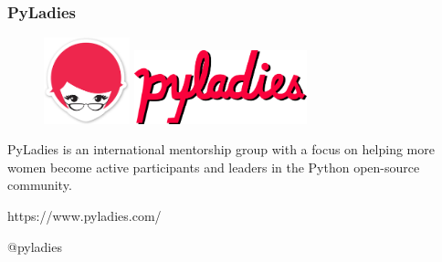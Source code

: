 \documentclass[18pt]{beamer}
\begin{document}
\begin{frame}

	\frametitle{PyLadies}
	
	\begin{figure}
		\includegraphics[width=2.5cm]{images/pyladies_cuadrado.png}
		\includegraphics[width=5cm]{images/pyladies_alargado.png}
	\end{figure}
	
	PyLadies is an international mentorship group with a focus on helping more 
	women become active participants and leaders in the Python 
	open-source community. 
	

	\vspace{0.6cm}    
	\centerline{https://www.pyladies.com/}
	
	\vspace{0.4cm}
	\centerline{@pyladies}
	
\end{frame}
\end{document}
